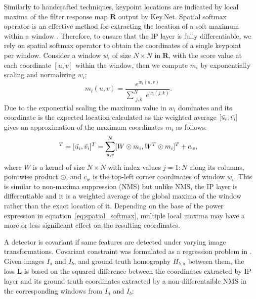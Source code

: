 Similarly to handcrafted techniques, keypoint locations are indicated by local maxima of the filter response map $\mathbf{R}$ output by Key.Net. Spatial softmax operator is an effective method for extracting the location of a soft maximum within a window \cite{LIFT, keypointnet_nips_18, OnoSerra18, detone2017superpoint}. Therefore, to ensure that the IP layer is fully differentiable, we rely on spatial softmax operator to obtain the coordinates of a single keypoint per window. Consider a window $w_i$ of size $N \times N$ in $\mathbf{R}$, with the score value at each coordinate $[u,v]$ within the window, then we compute $m_i$ by exponentially scaling and normalizing $w_i$: 
\begin{equation}
m_{i}(u,v) = \dfrac{e^{w_i(u, v)}}{\sum_{\substack{j, k}}^{N} e^{w_i(j, k)}}.
\label{eq:spatial_softmax}
\end{equation}
Due to the exponential scaling the maximum value in $w_i$ dominates and its coordinate is the expected location calculated as the weighted average $[\Bar{u_i},\Bar{v_i}]$ gives an approximation of the maximum coordinates $m_i$ as follows:
\begin{equation}
[x_i,y_i]^{T}=[\Bar{u_i}, \Bar{v_i}]^{T} =\sum_{\substack{u, v}}^{N} [W \odot m_{i}, W^T \odot m_{i}]^{T} + c_{w},
\label{eq:Index_Proposal}
\end{equation}
where $W$ is a kernel of size $N \times N$ with index values $j=1:N$ along its columns, pointwise product $\odot$, and $c_{w}$ is the top-left corner coordinates of window $w_{i}$. This is similar to non-maxima suppression (NMS) but unlike NMS, the IP layer is differentiable and it is a weighted average of the global maxima of the window rather than the exact location of it. Depending on the base of the power expression in equation~\ref{eq:spatial_softmax}, multiple local maxima may have a more or less significant effect on the resulting coordinates.

A detector is covariant if same features are detected under varying image transformations. Covariant constraint was formulated as a regression problem in \cite{Karel_Vedaldi_ECCV_16}. Given images $I_{a}$ and $I_{b}$, and ground truth homography $H_{b,a}$ between them, the loss $\mathbf{L}$ is based on the squared difference between the coordinates extracted by IP layer and its ground truth coordinates extracted by a non-differentaible NMS in the corresponding windows from $I_{a}$ and $I_{b}$:


